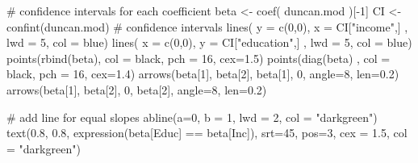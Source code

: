\documentclass[
  letterpaper,
  10pt,
  krantz2]{krantz}
\makeatletter
\newenvironment{Shaded}{\begin{snugshade}}{\end{snugshade}}
\newcommand{\AttributeTok}[1]{\textcolor[rgb]{0.40,0.45,0.13}{#1}}
\newcommand{\CommentTok}[1]{\textcolor[rgb]{0.37,0.37,0.37}{#1}}
\newcommand{\DecValTok}[1]{\textcolor[rgb]{0.68,0.00,0.00}{#1}}
\newcommand{\FloatTok}[1]{\textcolor[rgb]{0.68,0.00,0.00}{#1}}
\newcommand{\FunctionTok}[1]{\textcolor[rgb]{0.28,0.35,0.67}{#1}}
\newcommand{\NormalTok}[1]{\textcolor[rgb]{0.00,0.23,0.31}{#1}}
\newcommand{\OtherTok}[1]{\textcolor[rgb]{0.00,0.23,0.31}{#1}}
\newcommand{\SpecialCharTok}[1]{\textcolor[rgb]{0.37,0.37,0.37}{#1}}
\newcommand{\StringTok}[1]{\textcolor[rgb]{0.13,0.47,0.30}{#1}}
\newenvironment{kframe}{%
  \medskip{}
  \setlength{\fboxsep}{.8em}
  \def\at@end@of@kframe{}%
  \ifinner\ifhmode%
  \def\at@end@of@kframe{\end{minipage}}%
  \begin{minipage}{\columnwidth}%
  \fi\fi%
  \def\FrameCommand##1{\hskip\@totalleftmargin \hskip-\fboxsep
  \colorbox{shadecolor}{##1}\hskip-\fboxsep
      \hskip-\linewidth \hskip-\@totalleftmargin \hskip\columnwidth}%
  \MakeFramed {\advance\hsize-\width
    \@totalleftmargin\z@ \linewidth\hsize
    \@setminipage}}%
{\par\unskip\endMakeFramed%
  \at@end@of@kframe}
\renewenvironment{Shaded}{\begin{kframe}}{\end{kframe}}
\makeatother
\begin{document}
\begin{Shaded}
\begin{Highlighting}[]
\CommentTok{\# confidence intervals for each coefficient}
\NormalTok{beta }\OtherTok{\textless{}{-}} \FunctionTok{coef}\NormalTok{( duncan.mod )[}\SpecialCharTok{{-}}\DecValTok{1}\NormalTok{]}
\NormalTok{CI }\OtherTok{\textless{}{-}} \FunctionTok{confint}\NormalTok{(duncan.mod)       }\CommentTok{\# confidence intervals}
\FunctionTok{lines}\NormalTok{( }\AttributeTok{y =} \FunctionTok{c}\NormalTok{(}\DecValTok{0}\NormalTok{,}\DecValTok{0}\NormalTok{), }\AttributeTok{x =}\NormalTok{ CI[}\StringTok{"income"}\NormalTok{,] , }\AttributeTok{lwd =} \DecValTok{5}\NormalTok{, }\AttributeTok{col =} \StringTok{\textquotesingle{}blue\textquotesingle{}}\NormalTok{)}
\FunctionTok{lines}\NormalTok{( }\AttributeTok{x =} \FunctionTok{c}\NormalTok{(}\DecValTok{0}\NormalTok{,}\DecValTok{0}\NormalTok{), }\AttributeTok{y =}\NormalTok{ CI[}\StringTok{"education"}\NormalTok{,] , }\AttributeTok{lwd =} \DecValTok{5}\NormalTok{, }\AttributeTok{col =} \StringTok{\textquotesingle{}blue\textquotesingle{}}\NormalTok{)}
\FunctionTok{points}\NormalTok{(}\FunctionTok{rbind}\NormalTok{(beta), }\AttributeTok{col =} \StringTok{\textquotesingle{}black\textquotesingle{}}\NormalTok{, }\AttributeTok{pch =} \DecValTok{16}\NormalTok{, }\AttributeTok{cex=}\FloatTok{1.5}\NormalTok{)}
\FunctionTok{points}\NormalTok{(}\FunctionTok{diag}\NormalTok{(beta) , }\AttributeTok{col =} \StringTok{\textquotesingle{}black\textquotesingle{}}\NormalTok{, }\AttributeTok{pch =} \DecValTok{16}\NormalTok{, }\AttributeTok{cex=}\FloatTok{1.4}\NormalTok{)}
\FunctionTok{arrows}\NormalTok{(beta[}\DecValTok{1}\NormalTok{], beta[}\DecValTok{2}\NormalTok{], beta[}\DecValTok{1}\NormalTok{], }\DecValTok{0}\NormalTok{, }\AttributeTok{angle=}\DecValTok{8}\NormalTok{, }\AttributeTok{len=}\FloatTok{0.2}\NormalTok{)}
\FunctionTok{arrows}\NormalTok{(beta[}\DecValTok{1}\NormalTok{], beta[}\DecValTok{2}\NormalTok{], }\DecValTok{0}\NormalTok{, beta[}\DecValTok{2}\NormalTok{], }\AttributeTok{angle=}\DecValTok{8}\NormalTok{, }\AttributeTok{len=}\FloatTok{0.2}\NormalTok{)}

\CommentTok{\# add line for equal slopes}
\FunctionTok{abline}\NormalTok{(}\AttributeTok{a=}\DecValTok{0}\NormalTok{, }\AttributeTok{b =} \DecValTok{1}\NormalTok{, }\AttributeTok{lwd =} \DecValTok{2}\NormalTok{, }\AttributeTok{col =} \StringTok{"darkgreen"}\NormalTok{)}
\FunctionTok{text}\NormalTok{(}\FloatTok{0.8}\NormalTok{, }\FloatTok{0.8}\NormalTok{, }\FunctionTok{expression}\NormalTok{(beta[Educ] }\SpecialCharTok{==}\NormalTok{ beta[Inc]), }
     \AttributeTok{srt=}\DecValTok{45}\NormalTok{, }\AttributeTok{pos=}\DecValTok{3}\NormalTok{, }\AttributeTok{cex =} \FloatTok{1.5}\NormalTok{, }\AttributeTok{col =} \StringTok{"darkgreen"}\NormalTok{)}


\end{Highlighting}
\end{Shaded}
\end{document}

